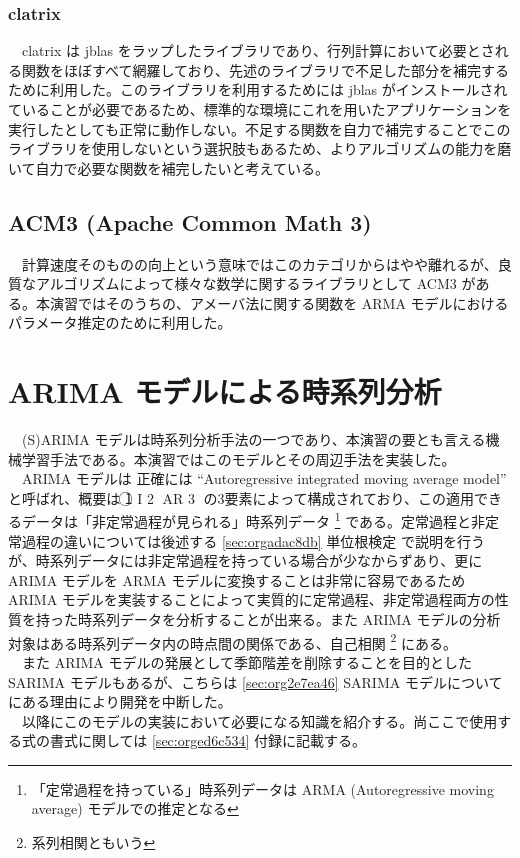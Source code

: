 \documentclass{scrartcl}
\begin{document}
\subsubsection{clatrix}
\label{sec:org11400f1}
　clatrix は jblas をラップしたライブラリであり、行列計算において必要とされる関数をほぼすべて網羅しており、先述のライブラリで不足した部分を補完するために利用した。このライブラリを利用するためには jblas がインストールされていることが必要であるため、標準的な環境にこれを用いたアプリケーションを実行したとしても正常に動作しない。不足する関数を自力で補完することでこのライブラリを使用しないという選択肢もあるため、よりアルゴリズムの能力を磨いて自力で必要な関数を補完したいと考えている。\\

\subsection{ACM3 (Apache Common Math 3)}
\label{sec:org5283925}
　計算速度そのものの向上という意味ではこのカテゴリからはやや離れるが、良質なアルゴリズムによって様々な数学に関するライブラリとして ACM3 がある。本演習ではそのうちの、アメーバ法に関する関数を ARMA モデルにおけるパラメータ推定のために利用した。\\
\section{ARIMA モデルによる時系列分析}
\label{sec:org4b9d808}
　(S)ARIMA モデルは時系列分析手法の一つであり、本演習の要とも言える機械学習手法である。本演習ではこのモデルとその周辺手法を実装した。\\
　ARIMA モデルは 正確には ``Autoregressive integrated moving average model'' と呼ばれ、概要は \textcircled{\scriptsize 1} I \textcircled{\scriptsize 2} AR \textcircled{\scriptsize 3} の3要素によって構成されており、この適用できるデータは「非定常過程が見られる」時系列データ \footnote{「定常過程を持っている」時系列データは ARMA (Autoregressive moving average) モデルでの推定となる} である。定常過程と非定常過程の違いについては後述する \ref{sec:orgadac8db} 単位根検定 で説明を行うが、時系列データには非定常過程を持っている場合が少なからずあり、更に ARIMA モデルを ARMA モデルに変換することは非常に容易であるため ARIMA モデルを実装することによって実質的に定常過程、非定常過程両方の性質を持った時系列データを分析することが出来る。また ARIMA モデルの分析対象はある時系列データ内の時点間の関係である、自己相関 \footnote{系列相関ともいう} にある。\\
　また ARIMA モデルの発展として季節階差を削除することを目的とした SARIMA モデルもあるが、こちらは \ref{sec:org2e7ea46} SARIMA モデルについて にある理由により開発を中断した。\\
　以降にこのモデルの実装において必要になる知識を紹介する。尚ここで使用する式の書式に関しては \ref{sec:orged6c534} 付録に記載する。\\
\end{document}

